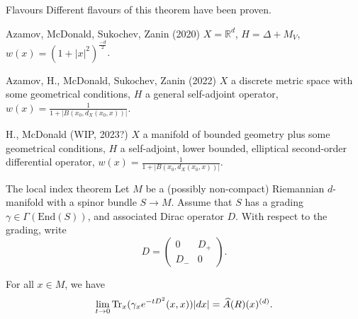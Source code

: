 \documentclass{beamer}
\numberwithin{equation}{section}
\theoremstyle{plain}
\theoremstyle{plain}
\theoremstyle{definition}
\theoremstyle{plain}
\theoremstyle{plain}
\theoremstyle{definition}
\newcommand{\tr}{{\rm Tr}}
\begin{document}
\begin{frame}{Flavours}
Different flavours of this theorem have been proven.
\begin{block}{Azamov, McDonald, Sukochev, Zanin (2020)}
$X = \mathbb{R}^d$, $H= \Delta+M_V$, $w(x) = (1+|x|^2)^{\frac{-d}{2}}$.
\end{block}

\begin{block}{Azamov, H., McDonald, Sukochev, Zanin (2022)}
$X$ a discrete metric space with some geometrical conditions, $H$ a general self-adjoint operator, $w(x) = \frac{1}{1+|B(x_0, d_X(x_0, x))|}$.
\end{block}

\begin{block}{H., McDonald (WIP, 2023?)}
$X$ a manifold of bounded geometry plus some geometrical conditions, $H$ a self-adjoint, lower bounded, elliptical second-order differential operator, $w(x) = \frac{1}{1+|B(x_0, d_X(x_0, x))|}$.
\end{block}
\end{frame}

% 
% 
\begin{frame}{The local index theorem}
    Let $M$ be a (possibly non-compact) Riemannian $d$-manifold with a spinor bundle $S\rightarrow M$. Assume that $S$
    has a grading $\gamma\in \Gamma(\mathrm{End}(S))$, and associated Dirac operator $D$. With respect to the grading, write 
    \begin{equation*}
        D = \begin{pmatrix} 0 & D_+\\ D_- & 0 \end{pmatrix}.
    \end{equation*}
    \pause
    \begin{theorem}
        For all $x \in M$, we have
        \begin{equation*}
            \lim_{t\to 0} \tr_x(\gamma_xe^{-tD^2}(x,x))|dx| = \widehat{A}(R)(x)^{(d)}.
        \end{equation*}
    \end{theorem}
\end{frame}
\end{document}
